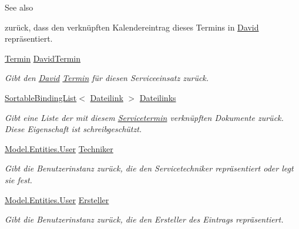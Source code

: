 \begin{DoxyCompactItemize}
\begin{DoxyCompactList}
\begin{DoxySeeAlso}{See also}
\end{DoxySeeAlso}
zurück, dass den verknüpften Kalendereintrag dieses Termins in \hyperlink{namespace_david}{David} repräsentiert. \end{DoxyCompactList}\item 
\hyperlink{class_products_1_1_model_1_1_entities_1_1_termin}{Termin} \hyperlink{class_products_1_1_model_1_1_entities_1_1_servicetermin_ac1f32709790db5dc81ba5192241424da}{David\+Termin}
\begin{DoxyCompactList}\small\item\em Gibt den \hyperlink{namespace_david}{David} \hyperlink{class_products_1_1_model_1_1_entities_1_1_termin}{Termin} für diesen Serviceeinsatz zurück. \end{DoxyCompactList}\item 
\hyperlink{class_products_1_1_common_1_1_sortable_binding_list}{Sortable\+Binding\+List}$<$ \hyperlink{class_products_1_1_model_1_1_entities_1_1_dateilink}{Dateilink} $>$ \hyperlink{class_products_1_1_model_1_1_entities_1_1_servicetermin_a8fdf7e1a0779e59e0dfc196a78a23b6b}{Dateilinks}
\begin{DoxyCompactList}\small\item\em Gibt eine Liste der mit diesem \hyperlink{class_products_1_1_model_1_1_entities_1_1_servicetermin}{Servicetermin} verknüpften Dokumente zurück. Diese Eigenschaft ist schreibgeschützt. \end{DoxyCompactList}\item 
\hyperlink{class_products_1_1_model_1_1_entities_1_1_user}{Model.\+Entities.\+User} \hyperlink{class_products_1_1_model_1_1_entities_1_1_servicetermin_a7d5e6be212ec17c3fc51af1efa4a92f0}{Techniker}
\begin{DoxyCompactList}\small\item\em Gibt die Benutzerinstanz zurück, die den Servicetechniker repräsentiert oder legt sie fest. \end{DoxyCompactList}\item 
\hyperlink{class_products_1_1_model_1_1_entities_1_1_user}{Model.\+Entities.\+User} \hyperlink{class_products_1_1_model_1_1_entities_1_1_servicetermin_afaeb62c182e10b5e4dfd438fb6b3e7bf}{Ersteller}
\begin{DoxyCompactList}\small\item\em Gibt die Benutzerinstanz zurück, die den Ersteller des Eintrags repräsentiert. \end{DoxyCompactList}\item 

\end{DoxyCompactItemize}
